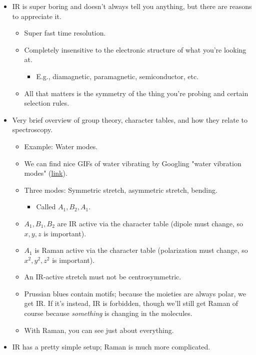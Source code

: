 \documentclass[../notes.tex]{subfiles}
\begin{document}
\begin{itemize}
    \item IR is super boring and doesn't always tell you anything, but there are reasons to appreciate it.
    \begin{itemize}
        \item Super fast time resolution.
        \item Completely insensitive to the electronic structure of what you're looking at.
        \begin{itemize}
            \item E.g., diamagnetic, paramagnetic, semiconductor, etc.
        \end{itemize}
        \item All that matters is the symmetry of the thing you're probing and certain selection rules.
    \end{itemize}
    \item Very brief overview of group theory, character tables, and how they relate to spectroscopy.
    \begin{itemize}
        \item Example: Water modes.
        \item We can find nice GIFs of water vibrating by Googling "water vibration modes" (\href{https://www.chem.purdue.edu/jmol/vibs/h2o.html}{link}).
        \item Three modes: Symmetric stretch, asymmetric stretch, bending.
        \begin{itemize}
            \item Called $A_1,B_2,A_1$.
        \end{itemize}
        \item $A_1,B_1,B_2$ are IR active via the character table (dipole must change, so $x,y,z$ is important).
        \item $A_1$ is Raman active via the character table (polarization must change, so $x^2,y^2,z^2$ is important).
        \item An IR-active stretch must not be centrosymmetric.
        \item Prussian blues contain  motifs; because the  moieties are always polar, we get IR. If it's  instead, IR is forbidden, though we'll still get Raman of course because \emph{something} is changing in the molecules.
        \item With Raman, you can see just about everything.
    \end{itemize}
    \item IR has a pretty simple setup; Raman is much more complicated.

\end{itemize}
\end{document}
